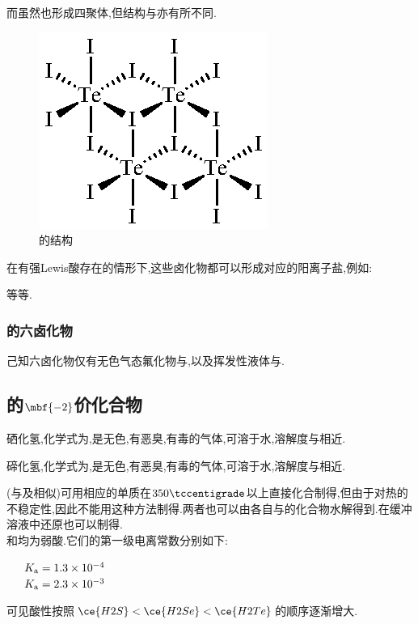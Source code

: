 \documentclass{ctexart}
\begin{document}
而虽然也形成四聚体,但结构与亦有所不同.
\begin{figure}[H]
    \centering\includegraphics{picture/Te4I16.eps}
    \caption{的结构}
\end{figure}
在有强Lewis酸存在的情形下,这些卤化物都可以形成对应的阳离子盐,例如:
\begin{center}
\end{center}
等等.
\subsubsection{的六卤化物}
己知六卤化物仅有无色气态氟化物与,以及挥发性液体与.
\subsection{的$\mbf{-2}$价化合物}
\begin{substance}[\ce{H2Se}]
    硒化氢,化学式为,是无色,有恶臭,有毒的气体,可溶于水,溶解度与相近.
\end{substance}
\begin{substance}[\ce{H2Te}]
    碲化氢,化学式为,是无色,有恶臭,有毒的气体,可溶于水,溶解度与相近.
\end{substance}
(与及相似)可用相应的单质在$350\tccentigrade$以上直接化合制得,但由于对热的不稳定性,因此不能用这种方法制得.两者也可以由各自与的化合物水解得到.在缓冲溶液中还原也可以制得.\\
\indent {}和均为弱酸.它们的第一级电离常数分别如下:
\begin{center}
    \ \ \ $K_\text a=1.3\times10^{-4}$\\
    \ \ \ $K_\text a=2.3\times10^{-3}$
\end{center}
可见酸性按照$\ce{H2S}<\ce{H2Se}<\ce{H2Te}$的顺序逐渐增大.
\end{document}
